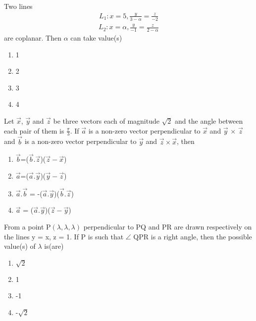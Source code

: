 \item Two lines
\begin{align*}
L_1: x = 5, \frac{y}{3 - \alpha} = \frac{z}{-2}
\end{align*}
\begin{align*}
L_2: x = \alpha, \frac{y}{-1} = \frac{z}{2-\alpha}
\end{align*}
are coplanar. Then $\alpha$ can take value(s)
\begin{enumerate}
\item 1
\item 2
\item 3
\item 4
\end{enumerate}

\item Let $\overrightarrow{x}$, $\overrightarrow{y}$ and $\overrightarrow{z}$ be three vectors each of magnitude 
$\sqrt{2}$ and the angle between each pair of them is $\frac{\pi}{3}$. If $\overrightarrow{a}$ is a non-zero vector perpendicular to $\overrightarrow{x}$ and $\overrightarrow{y}$ $\times$ $\overrightarrow{z}$ and $\overrightarrow{b}$ is a non-zero vector perpendicular to $\overrightarrow{y}$ and $\overrightarrow{z} \times \overrightarrow{x}$, then
\begin{enumerate}
\item $\overrightarrow{b}$=($\overrightarrow{b} . \overrightarrow{z}$)($\overrightarrow{z} - \overrightarrow{x}$)
\item $\overrightarrow{a}$=($\overrightarrow{a} . \overrightarrow{y}$)($\overrightarrow{y} - \overrightarrow{z}$)
\item $\overrightarrow{a}$.$\overrightarrow{b}$ = -($\overrightarrow{a} . \overrightarrow{y}$)($\overrightarrow{b} . \overrightarrow{z}$)
\item $\overrightarrow{a}$ = ($\overrightarrow{a} . \overrightarrow{y}$)($\overrightarrow{z} - \overrightarrow{y}$)
\end{enumerate}

\item From a point P$(\lambda, \lambda, \lambda)$ perpendicular to PQ and PR are drawn respectively on the lines y = x, z = 1. If P is such that $\angle$ QPR is a right angle, then the possible value(s) of $\lambda$ is(are)
\begin{enumerate}
\item $\sqrt{2}$
\item 1
\item -1
\item -$\sqrt{2}$
\end{enumerate} 

